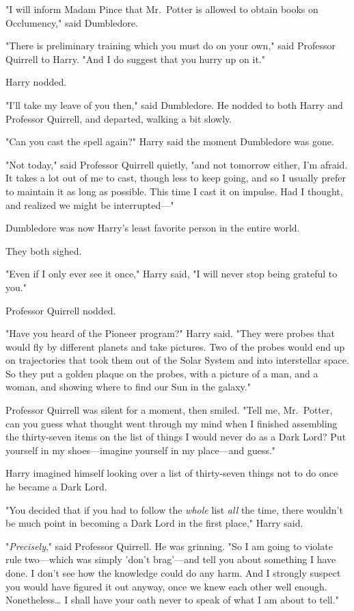 "I will inform Madam Pince that Mr.~Potter is allowed to obtain books on Occlumency," said Dumbledore.

"There is preliminary training which you must do on your own," said Professor Quirrell to Harry. "And I do suggest that you hurry up on it."

Harry nodded.

"I'll take my leave of you then," said Dumbledore. He nodded to both Harry and Professor Quirrell, and departed, walking a bit slowly.

"Can you cast the spell again?" Harry said the moment Dumbledore was gone.

"Not today," said Professor Quirrell quietly, "and not tomorrow either, I'm afraid. It takes a lot out of me to cast, though less to keep going, and so I usually prefer to maintain it as long as possible. This time I cast it on impulse. Had I thought, and realized we might be interrupted---"

Dumbledore was now Harry's least favorite person in the entire world.

They both sighed.

"Even if I only ever see it once," Harry said, "I will never stop being grateful to you."

Professor Quirrell nodded.

"Have you heard of the Pioneer program?" Harry said. "They were probes that would fly by different planets and take pictures. Two of the probes would end up on trajectories that took them out of the Solar System and into interstellar space. So they put a golden plaque on the probes, with a picture of a man, and a woman, and showing where to find our Sun in the galaxy."

Professor Quirrell was silent for a moment, then smiled. "Tell me, Mr.~Potter, can you guess what thought went through my mind when I finished assembling the thirty-seven items on the list of things I would never do as a Dark Lord? Put yourself in my shoes---imagine yourself in my place---and guess."

Harry imagined himself looking over a list of thirty-seven things not to do once he became a Dark Lord.

"You decided that if you had to follow the \emph{whole} list \emph{all} the time, there wouldn't be much point in becoming a Dark Lord in the first place," Harry said.

"\emph{Precisely}," said Professor Quirrell. He was grinning. "So I am going to violate rule two---which was simply 'don't brag'---and tell you about something I have done. I don't see how the knowledge could do any harm. And I strongly suspect you would have figured it out anyway, once we knew each other well enough. Nonetheless{\ldots} I shall have your oath never to speak of what I am about to tell."

